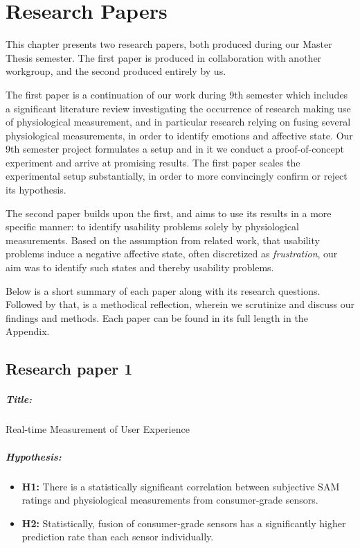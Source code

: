 \chapter{Research Papers}
This chapter presents two research papers, both produced during our Master
Thesis semester. The first paper is produced in collaboration with another
workgroup, and the second produced entirely by us.

The first paper is a continuation of our work during 9th semester which includes
a significant literature review investigating the occurrence of research making
use of physiological measurement, and in particular research relying on fusing
several physiological measurements, in order to identify emotions and affective
state. Our 9th semester project formulates a setup and in it we conduct a
proof-of-concept experiment and arrive at promising results. The first paper
scales the experimental setup substantially, in order to more convincingly
confirm or reject its hypothesis.

The second paper builds upon the first, and aims to use its results in a more
specific manner: to identify usability problems solely by physiological
measurements. Based on the assumption from related work, that usability problems
induce a negative affective state, often discretized as \textit{frustration},
our aim was to identify such states and thereby usability problems.

Below is a short summary of each paper along with its research questions.
Followed by that, is a methodical reflection, wherein we scrutinize and discuss
our findings and methods. Each paper can be found in its full length in the
Appendix.

\section{Research paper 1}
\paragraph{Title:}
Real-time Measurement of User Experience
\paragraph{Hypothesis:}
\begin{itemize}
    \item \textbf{H1:} There is a statistically significant
      correlation between subjective SAM ratings and physiological
      measurements from consumer-grade sensors.
    \item \textbf{H2:} Statistically, fusion of consumer-grade sensors
      has a significantly higher prediction rate than each sensor
      individually.
\end{itemize}
